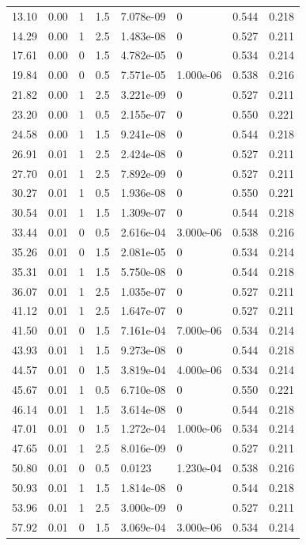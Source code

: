 \documentclass[preview]{standalone}
\begin{document}
{{\begin{tabular}{L{1.2cm}C{1.2cm} C{0.3cm}C{0.5cm} C{1.4cm}C{1.4cm} C{1.4cm}C{1.4cm}}
  13.10  &  0.00  & 1     & 1.5 &  7.078e-09  & 0  & 0.544 &  0.218   \\ 
  14.29  &  0.00  & 1     & 2.5 &  1.483e-08  & 0  & 0.527 &  0.211   \\ 
  17.61  &  0.00  & 0     & 1.5 &  4.782e-05  & 0  & 0.534 &  0.214   \\ 
  19.84  &  0.00  & 0     & 0.5 &  7.571e-05  & 1.000e-06  & 0.538 &  0.216   \\ 
  21.82  &  0.00  & 1     & 2.5 &  3.221e-09  & 0  & 0.527 &  0.211   \\ 
  23.20  &  0.00  & 1     & 0.5 &  2.155e-07  & 0  & 0.550 &  0.221   \\ 
  24.58  &  0.00  & 1     & 1.5 &  9.241e-08  & 0  & 0.544 &  0.218   \\ 
  26.91  &  0.01  & 1     & 2.5 &  2.424e-08  & 0  & 0.527 &  0.211   \\ 
  27.70  &  0.01  & 1     & 2.5 &  7.892e-09  & 0  & 0.527 &  0.211   \\ 
  30.27  &  0.01  & 1     & 0.5 &  1.936e-08  & 0  & 0.550 &  0.221   \\ 
  30.54  &  0.01  & 1     & 1.5 &  1.309e-07  & 0  & 0.544 &  0.218   \\ 
  33.44  &  0.01  & 0     & 0.5 &  2.616e-04  & 3.000e-06  & 0.538 &  0.216   \\ 
  35.26  &  0.01  & 0     & 1.5 &  2.081e-05  & 0  & 0.534 &  0.214   \\ 
  35.31  &  0.01  & 1     & 1.5 &  5.750e-08  & 0  & 0.544 &  0.218   \\ 
  36.07  &  0.01  & 1     & 2.5 &  1.035e-07  & 0  & 0.527 &  0.211   \\ 
  41.12  &  0.01  & 1     & 2.5 &  1.647e-07  & 0  & 0.527 &  0.211   \\ 
  41.50  &  0.01  & 0     & 1.5 &  7.161e-04  & 7.000e-06  & 0.534 &  0.214   \\ 
  43.93  &  0.01  & 1     & 1.5 &  9.273e-08  & 0  & 0.544 &  0.218   \\ 
  44.57  &  0.01  & 0     & 1.5 &  3.819e-04  & 4.000e-06  & 0.534 &  0.214   \\ 
  45.67  &  0.01  & 1     & 0.5 &  6.710e-08  & 0  & 0.550 &  0.221   \\ 
  46.14  &  0.01  & 1     & 1.5 &  3.614e-08  & 0  & 0.544 &  0.218   \\ 
  47.01  &  0.01  & 0     & 1.5 &  1.272e-04  & 1.000e-06  & 0.534 &  0.214   \\ 
  47.65  &  0.01  & 1     & 2.5 &  8.016e-09  & 0  & 0.527 &  0.211   \\ 
  50.80  &  0.01  & 0     & 0.5 &  0.0123  & 1.230e-04  & 0.538 &  0.216   \\ 
  50.93  &  0.01  & 1     & 1.5 &  1.814e-08  & 0  & 0.544 &  0.218   \\ 
  53.96  &  0.01  & 1     & 2.5 &  3.000e-09  & 0  & 0.527 &  0.211   \\ 
  57.92  &  0.01  & 0     & 1.5 &  3.069e-04  & 3.000e-06  & 0.534 &  0.214   \\ 
\hline 
\end{tabular} 

}}
\end{document}

